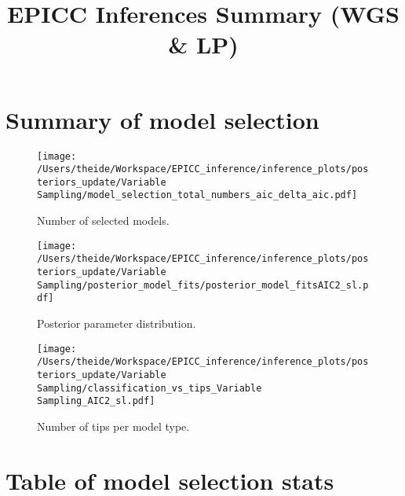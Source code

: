 \documentclass[]{article}
\title{EPICC Inferences Summary (WGS \& LP)}
\author{}
\begin{document}
\maketitle
\newpage

\tableofcontents
\newpage

\section{Summary of model selection}

\begin{figure}[h!]
	\centering	\texttt{[image: /Users/theide/Workspace/EPICC\_inference/inference\_plots/posteriors\_update/Variable Sampling/model\_selection\_total\_numbers\_aic\_delta\_aic.pdf]}
	\caption{Number of selected models.}
\end{figure}


\begin{figure}[h!]
	\centering	\texttt{[image: /Users/theide/Workspace/EPICC\_inference/inference\_plots/posteriors\_update/Variable Sampling/posterior\_model\_fits/posterior\_model\_fitsAIC2\_sl.pdf]}
	\caption{Posterior parameter distribution.}
\end{figure}

\begin{figure}[h!]
	\centering
	\texttt{[image: /Users/theide/Workspace/EPICC\_inference/inference\_plots/posteriors\_update/Variable Sampling/classification\_vs\_tips\_Variable Sampling\_AIC2\_sl.pdf]}
	\caption{Number of tips per model type.}
\end{figure}

\clearpage

\section{Table of model selection stats}


\clearpage
				
\end{document}
